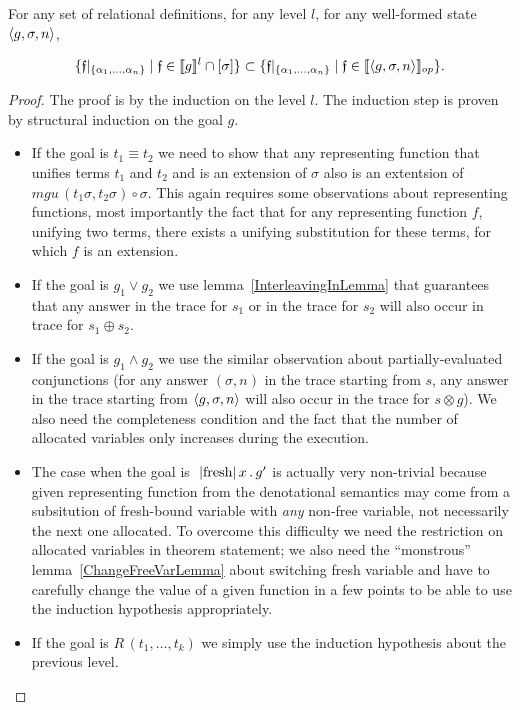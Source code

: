 \begin{lemma}
\label{GenCompletenessLemma}
For any set of relational definitions, for any level $l$, for any well-formed state $\left<{g, \sigma, n}\right>$,

\[
\{\mathfrak{f}|_{\{\alpha_1,\dots,\alpha_n\}} \mid \mathfrak{f} \in \llbracket{g}\rrbracket^l \cap [\sigma]\} \subset \{\mathfrak{f}|_{\{\alpha_1,\dots,\alpha_n\}} \mid \mathfrak{f} \in \llbracket{\left<{g, \sigma, n}\right>}\rrbracket_{op}\}.
\]
\end{lemma}
\begin{proof}
The proof is by the induction on the level $l$. The induction step is proven by structural induction on the goal $g$.

{ \color{orange}

\begin{itemize}
\item If the goal is $t_1\equiv t_2$ we need to show that any representing function that unifies terms $t_1$ and $t_2$ and is an extension of $\sigma$ also is an extentsion of $mgu\,(t_1 \sigma, t_2 \sigma) \circ \sigma$. This again requires some observations about representing functions, most importantly the fact that for any representing function $f$, unifying two terms, there exists a unifying substitution for these terms, for which $f$ is an extension.
\item If the goal is $g_1\vee g_2$ we use lemma~\ref{InterleavingInLemma} that guarantees that any answer in the trace for $s_1$ or in the trace for $s_2$ will also occur in trace for $s_1 \oplus s_2$.
\item If the goal is $g_1\wedge g_2$ we use the similar observation about partially-evaluated conjunctions (for any answer $(\sigma, n)$ in the trace starting from $s$, any answer in the trace starting from $\left<{g, \sigma, n}\right>$ will also occur in the trace for $s \otimes g$). We also need the completeness condition and the fact that the number of allocated variables only increases during the execution.
\item The case when the goal is $\mbox{\lstinline|fresh|}\,x\,.\,g'$ is actually very non-trivial because given representing function from the denotational semantics may come from a subsitution of fresh-bound variable with \emph{any} non-free variable, not necessarily the next one allocated. To overcome this difficulty we need the restriction on allocated variables in theorem statement; we also need the ``monstrous'' lemma~\ref{ChangeFreeVarLemma} about switching fresh variable and have to carefully change the value of a given function in a few points to be able to use the induction hypothesis appropriately.
\item If the goal is $R\,(t_1,\dots,t_k)$ we simply use the induction hypothesis about the previous level.
\end{itemize}
}
\end{proof}

